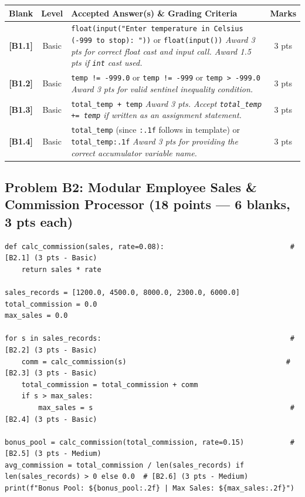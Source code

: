 \documentclass[11pt,a4paper]{article}
\begin{document}
\begin{center}
\renewcommand{\arraystretch}{1.12}
\setlength{\tabcolsep}{3.5pt}
\begin{tabularx}{\textwidth}{|c|c|X|c|}
\hline
\textbf{Blank} & \textbf{Level} & \textbf{Accepted Answer(s) \& Grading Criteria} & \textbf{Marks} \\
\hline
\textbf{[B1.1]} & Basic & \texttt{float(input("Enter temperature in Celsius (-999 to stop): "))} or \texttt{float(input())}\newline
\textit{Award 3 pts for correct float cast and input call. Award 1.5 pts if \texttt{int} cast used.} & 3 pts \\
\hline
\textbf{[B1.2]} & Basic & \texttt{temp != -999.0} or \texttt{temp != -999} or \texttt{temp > -999.0}\newline
\textit{Award 3 pts for valid sentinel inequality condition.} & 3 pts \\
\hline
\textbf{[B1.3]} & Basic & \texttt{total\_temp + temp}\newline
\textit{Award 3 pts. Accept \texttt{total\_temp += temp} if written as an assignment statement.} & 3 pts \\
\hline
\textbf{[B1.4]} & Basic & \texttt{total\_temp} (since \texttt{:.1f} follows in template) or \texttt{total\_temp:.1f}\newline
\textit{Award 3 pts for providing the correct accumulator variable name.} & 3 pts \\
\hline
\end{tabularx}
\end{center}

\newpage

\subsection*{Problem B2: Modular Employee Sales \& Commission Processor (18 points --- 6 blanks, 3 pts each)}

\begin{lstlisting}
def calc_commission(sales, rate=0.08):                              # [B2.1] (3 pts - Basic)
    return sales * rate

sales_records = [1200.0, 4500.0, 8000.0, 2300.0, 6000.0]
total_commission = 0.0
max_sales = 0.0

for s in sales_records:                                             # [B2.2] (3 pts - Basic)
    comm = calc_commission(s)                                      # [B2.3] (3 pts - Basic)
    total_commission = total_commission + comm
    if s > max_sales:
        max_sales = s                                               # [B2.4] (3 pts - Basic)

bonus_pool = calc_commission(total_commission, rate=0.15)           # [B2.5] (3 pts - Medium)
avg_commission = total_commission / len(sales_records) if len(sales_records) > 0 else 0.0  # [B2.6] (3 pts - Medium)
print(f"Bonus Pool: ${bonus_pool:.2f} | Max Sales: ${max_sales:.2f}")
\end{lstlisting}
\end{document}
